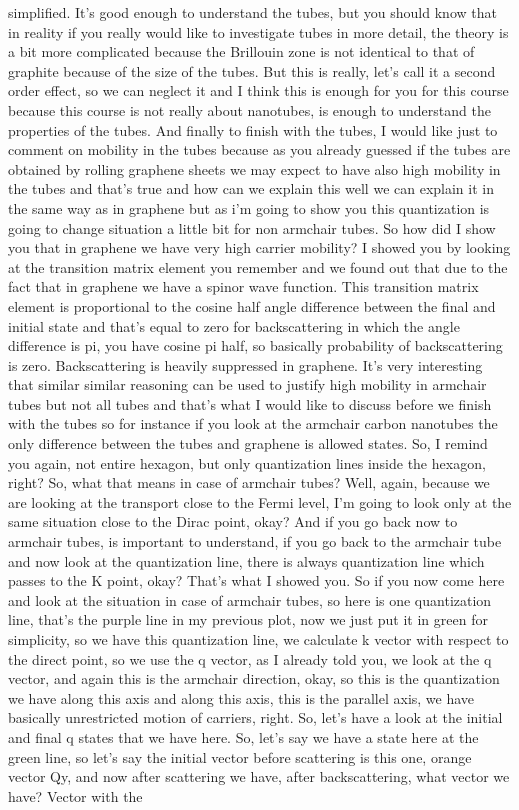 simplified. It's good enough to understand the tubes, but you should know that in reality if you really would like to investigate tubes in more detail, the theory is a bit more complicated because the Brillouin zone is not identical to that of graphite because of the size of the tubes.
But this is really, let's call it a second order effect, so we can neglect it and I think this is enough for you for this course because this course is not really about nanotubes, is enough to understand the properties of the tubes. And finally to finish with the tubes, I would like just to comment on mobility in the tubes because as you already guessed if the tubes are obtained by rolling graphene sheets we may expect to have also high mobility in the tubes and that's true and how can we explain this well we can explain it in the same way as in graphene but as i'm going to show you this quantization is going to change situation a little bit for non armchair tubes. So how did I show you that in graphene we have very high carrier mobility? I showed you by looking at the transition matrix element you remember and we found out that due to the fact that in graphene we have a spinor wave function. This transition matrix element is proportional to the cosine half angle difference between the final and initial state and that's equal to zero for backscattering in which the angle difference is pi, you have cosine pi half, so basically probability of backscattering is zero. Backscattering is heavily suppressed in graphene. It's very interesting that similar similar reasoning can be used to justify high mobility in armchair tubes but not all tubes and that's what I would like to discuss before we finish with the tubes so for instance if you look at the armchair carbon nanotubes the only difference between the tubes and graphene is allowed states. So, I remind you again, not entire hexagon, but only quantization lines inside the hexagon, right? So, what that means in case of armchair tubes? Well, again, because we are looking at the transport close to the Fermi level, I'm going to look only at the same situation close to the Dirac point, okay? And if you go back now to armchair tubes, is important to understand, if you go back to the armchair tube and now look at the quantization line, there is always quantization line which passes to the K point, okay? That's what I showed you. So if you now come here and look at the situation in case of armchair tubes, so here is one quantization line, that's the purple line in my previous plot, now we just put it in green for simplicity, so we have this quantization line, we calculate k vector with respect to the direct point, so we use the q vector, as I already told you, we look at the q vector, and again this is the armchair direction, okay, so this is the quantization we have along this axis and along this axis, this is the parallel axis, we have basically unrestricted motion of carriers, right. So, let's have a look at the initial and final q states that we have here. So, let's say we have a state here at the green line, so let's say the initial vector before scattering is this one, orange vector Qy, and now after scattering we have, after backscattering, what vector we have? Vector with the 